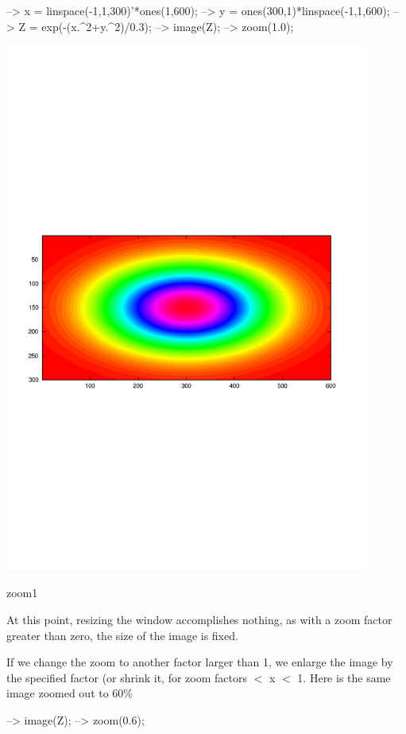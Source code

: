 \begin{DoxyVerbInclude}
--> x = linspace(-1,1,300)'*ones(1,600);
--> y = ones(300,1)*linspace(-1,1,600);
--> Z = exp(-(x.^2+y.^2)/0.3);
--> image(Z);
--> zoom(1.0);
\end{DoxyVerbInclude}


 
\begin{DoxyImage}
\includegraphics[width=12cm]{zoom1}
\caption{zoom1}
\end{DoxyImage}


At this point, resizing the window accomplishes nothing, as with a zoom factor greater than zero, the size of the image is fixed.

If we change the zoom to another factor larger than 1, we enlarge the image by the specified factor (or shrink it, for zoom factors { $<$ x $<$ 1}. Here is the same image zoomed out to 60\%


\begin{DoxyVerbInclude}
--> image(Z);
--> zoom(0.6);
\end{DoxyVerbInclude}


